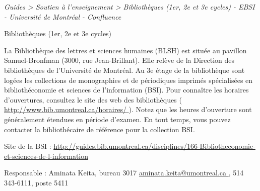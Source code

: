\documentclass [12 pt]{article}
\begin{document}
        
        
        \textit{
        Guides > Soutien à l'enseignement > Bibliothèques (1er, 2e et 3e cycles) -
            EBSI - Université de Montréal - Confluence
        }
    
        Bibliothèques (1er, 2e et 3e cycles)
        
            La Bibliothèque des lettres et sciences humaines (BLSH) est située au pavillon
                Samuel-Bronfman (3000, rue Jean-Brillant). Elle relève de la Direction des
                bibliothèques de l'Université de Montréal. Au 3e étage de la bibliothèque
                sont logées les collections de monographies et de périodiques imprimés spécialisées
                en bibliothéconomie et sciences de l'information (BSI). Pour connaître les horaires
                d'ouvertures, consultez le site des web des bibliothèques (
        \href{
        http://www.bib.umontreal.ca/horaires/
        } {
        http://www.bib.umontreal.ca/horaires/
        }
    ). Notez que les heures
                d'ouverture sont généralement étendues en période d'examen. En tout temps, vous
                pouvez contacter la bibliothécaire de référence pour la collection BSI.
            
                Site de la BSI : 
        \href{
        http://guides.bib.umontreal.ca/disciplines/166-Bibliotheconomie-et-sciences-de-l-information
        } {
        http://guides.bib.umontreal.ca/disciplines/166-Bibliotheconomie-et-sciences-de-l-information
        }
    
                Responsable : Aminata Keita, bureau 3017
        \href{
        mailto:aminata.keita@umontreal.ca
        } {
        aminata.keita@umontreal.ca
        }
    , 514 343-6111, poste 5411
            
\end{document}

